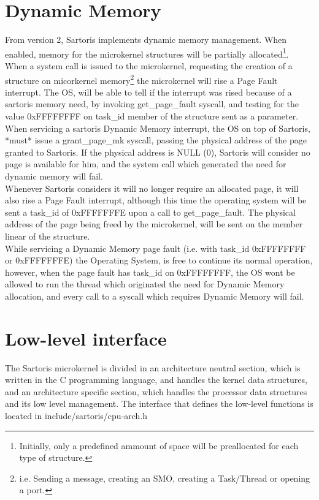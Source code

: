 \documentclass[11pt, letterpaper, twoside, english]{book}
\begin{document}
\section{Dynamic Memory} \label{sec:dynamicmemory}

From version 2, Sartoris implements dynamic memory management. When enabled, memory for the microkernel structures will be partially allocated\footnote{Initially, only a predefined ammount of space will be preallocated for each type of structure.}.\\
When a system call is issued to the microkernel, requesting the creation of a structure on micorkernel memory\footnote{i.e. Sending a message, creating an SMO, creating a Task/Thread or opening a port.} the microkernel will rise a Page Fault interrupt. The OS, will be able to tell if the interrupt was rised because of a sartoris memory need, by invoking \textsf{get\_page\_fault} syscall, and testing for the value \textsf{0xFFFFFFFF} on task\_id member of the structure sent as a parameter. When servicing a sartoris Dynamic Memory interrupt, the OS on top of Sartoris, *must* issue a \textsf{grant\_page\_mk} syscall, passing the physical address of the page granted to Sartoris. If the physical address is NULL (0), Sartoris will consider no page is available for him, and the system call which generated the need for dynamic memory will fail.\\ 
Whenever Sartoris considers it will no longer require an allocated page, it will also rise a Page Fault interrupt, although this time the operating system will be sent a task\_id of 0xFFFFFFFE upon a call to \textsf{get\_page\_fault}. The physical address of the page being freed by the microkernel, will be sent on the member \textsf{linear} of the structure.\\
While servicing a Dynamic Memory page fault (i.e. with task\_id 0xFFFFFFFF or 0xFFFFFFFE) the Operating System, is free to continue its normal operation, however, when the page fault has task\_id on 0xFFFFFFFF, the OS wont be allowed to run the thread which originated the need for Dynamic Memory allocation, and every call to a syscall which requires Dynamic Memory will fail.

\section{Low-level interface} \label{sec:lowlevelinterface}

The Sartoris microkernel is divided in an architecture neutral section, which is written in the C programming language, and handles the kernel data structures, and an architecture specific section, which handles the processor data structures and its low level management. The interface that defines the low-level functions is located in \textsf{include/sartoris/cpu-arch.h}
\end{document}
